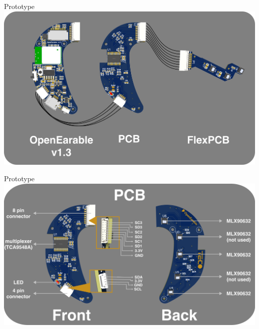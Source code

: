 \documentclass[en]{sdqbeamer}
\begin{document}
\begin{frame}{Prototype}
    \includegraphics[width=0.6\linewidth]{../thesis-doc/images/prototype/PrototypeConnection.png} %
\end{frame}

\begin{frame}{Prototype}
    \includegraphics[width=0.6\linewidth]{../thesis-doc/images/prototype/PCB_Description.png} %
\end{frame}
\end{document}

